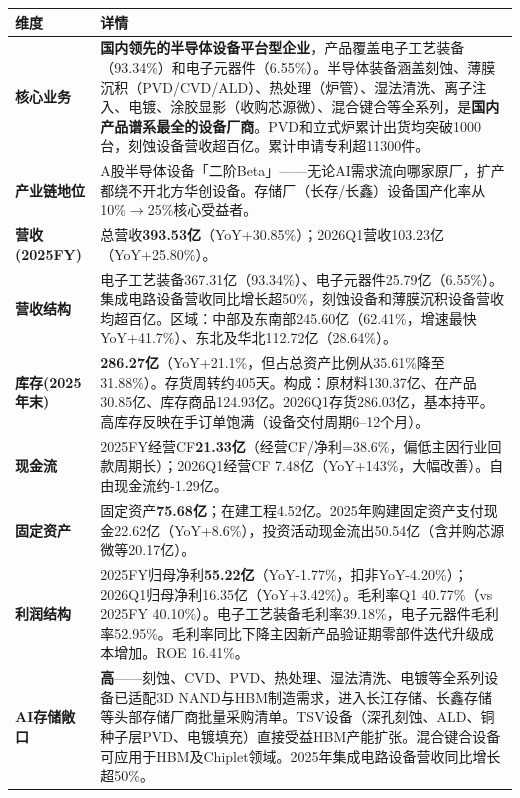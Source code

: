 \begin{exhibitbox}
\centering
\scriptsize
\renewcommand{\arraystretch}{1.20}
\begin{tabularx}{\exhibitboxwidth}{>{\bfseries}p{2.2cm} >{\raggedright\arraybackslash\sloppy\hspace{0pt}}X}
\toprule
\textbf{维度} & \textbf{详情} \\
\midrule
核心业务 & \textbf{国内领先的半导体设备平台型企业}，产品覆盖电子工艺装备（93.34\%）和电子元器件（6.55\%）。半导体装备涵盖刻蚀、薄膜沉积（PVD/CVD/ALD）、热处理（炉管）、湿法清洗、离子注入、电镀、涂胶显影（收购芯源微）、混合键合等全系列，是\textbf{国内产品谱系最全的设备厂商}。PVD和立式炉累计出货均突破1000台，刻蚀设备营收超百亿。累计申请专利超11300件。 \\
产业链地位 & A股半导体设备「二阶Beta」——无论AI需求流向哪家原厂，扩产都绕不开北方华创设备。存储厂（长存/长鑫）设备国产化率从10\%$\to$25\%核心受益者。 \\
营收(2025FY) & 总营收\textbf{393.53亿}（YoY+30.85\%）；2026Q1营收103.23亿（YoY+25.80\%）。 \\
营收结构 & 电子工艺装备367.31亿（93.34\%）、电子元器件25.79亿（6.55\%）。集成电路设备营收同比增长超50\%，刻蚀设备和薄膜沉积设备营收均超百亿。区域：中部及东南部245.60亿（62.41\%，增速最快YoY+41.7\%）、东北及华北112.72亿（28.64\%）。 \\
库存(2025年末) & \textbf{286.27亿}（YoY+21.1\%，但占总资产比例从35.61\%降至31.88\%）。存货周转约405天。构成：原材料130.37亿、在产品30.85亿、库存商品124.93亿。2026Q1存货286.03亿，基本持平。高库存反映在手订单饱满（设备交付周期6--12个月）。 \\
现金流 & 2025FY经营CF\textbf{21.33亿}（经营CF/净利=38.6\%，偏低主因行业回款周期长）；2026Q1经营CF 7.48亿（YoY+143\%，大幅改善）。自由现金流约-1.29亿。 \\
固定资产 & 固定资产\textbf{75.68亿}；在建工程4.52亿。2025年购建固定资产支付现金22.62亿（YoY+8.6\%），投资活动现金流出50.54亿（含并购芯源微等20.17亿）。 \\
利润结构 & 2025FY归母净利\textbf{55.22亿}（YoY-1.77\%，扣非YoY-4.20\%）；2026Q1归母净利16.35亿（YoY+3.42\%）。毛利率Q1 40.77\%（vs 2025FY 40.10\%）。电子工艺装备毛利率39.18\%，电子元器件毛利率52.95\%。毛利率同比下降主因新产品验证期零部件迭代升级成本增加。ROE 16.41\%。 \\
AI存储敞口 & \textbf{高}——刻蚀、CVD、PVD、热处理、湿法清洗、电镀等全系列设备已适配3D NAND与HBM制造需求，进入长江存储、长鑫存储等头部存储厂商批量采购清单。TSV设备（深孔刻蚀、ALD、铜种子层PVD、电镀填充）直接受益HBM产能扩张。混合键合设备可应用于HBM及Chiplet领域。2025年集成电路设备营收同比增长超50\%。 \\
\bottomrule
\end{tabularx}
\end{exhibitbox}


